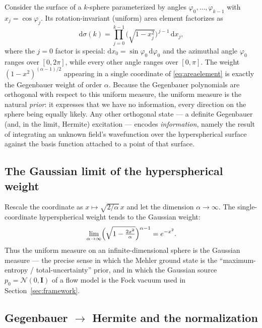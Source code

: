 \documentclass[11pt, a4paper]{article}
\begin{document}
Consider the surface of a $k$-sphere parameterized by angles
$\varphi_0,\dots,\varphi_{k-1}$ with $x_j=\cos\varphi_j$. Its rotation-invariant
(uniform) area element factorizes as
\begin{equation}
  \mathrm{d}\sigma(k)=\prod_{j=0}^{k-1}
  \bigl(\sqrt{1-x_j^2}\bigr)^{\,j-1}\,\mathrm{d}x_j ,
  \label{eq:areaelement}
\end{equation}
where the $j=0$ factor is special: $\mathrm{d}x_0=\sin\varphi_0\,
\mathrm{d}\varphi_0$ and the azimuthal angle $\varphi_0$ ranges over
$[0,2\pi]$, while every other angle ranges over $[0,\pi]$. The weight
$(1-x^2)^{(\alpha-1)/2}$ appearing in a single coordinate of
\eqref{eq:areaelement} is exactly the Gegenbauer weight of order
$\alpha$. Because the Gegenbauer polynomials are orthogonal with respect to
this uniform measure, the uniform measure is the natural \emph{prior}: it
expresses that we have no information, every direction on the sphere being
equally likely. Any other orthogonal state --- a definite Gegenbauer (and, in
the limit, Hermite) excitation --- encodes \emph{information}, namely the
result of integrating an unknown field's wavefunction over the hyperspherical
surface against the basis function attached to a point of that surface.

\subsection{The Gaussian limit of the hyperspherical weight}

Rescale the coordinate as $x\mapsto\sqrt{2/\alpha}\,x$ and let the dimension
$\alpha\to\infty$. The single-coordinate hyperspherical weight tends to the
Gaussian weight:
\begin{equation}
  \lim_{\alpha\to\infty}\Bigl(\sqrt{1-\tfrac{2x^2}{\alpha}}\Bigr)^{\alpha-1}
  =e^{-x^2}.
  \label{eq:gaussweight}
\end{equation}
Thus the uniform measure on an infinite-dimensional sphere is the Gaussian
measure --- the precise sense in which the Mehler ground state is the
``maximum-entropy / total-uncertainty'' prior, and in which the Gaussian source
$p_0=\mathcal{N}(0,\mathbf I)$ of a flow model is the Fock vacuum used in
Section~\ref{sec:framework}.

\subsection{Gegenbauer \texorpdfstring{$\to$}{to} Hermite and the normalization}
\end{document}
